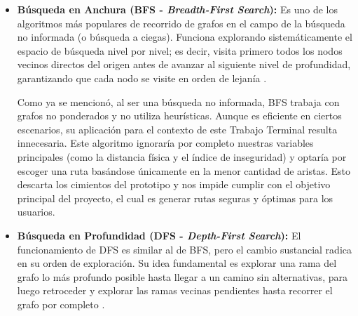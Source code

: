 \begin{itemize}

    
    \item \textbf{Búsqueda en Anchura (BFS - \textit{Breadth-First Search}):} Es uno de los algoritmos más populares de recorrido de grafos en el campo de la búsqueda no informada (o búsqueda a ciegas). Funciona explorando sistemáticamente el espacio de búsqueda nivel por nivel; es decir, visita primero todos los nodos vecinos directos del origen antes de avanzar al siguiente nivel de profundidad, garantizando que cada nodo se visite en orden de lejanía \cite{busqueda_info_no, bfs}.
    
    Como ya se mencionó, al ser una búsqueda no informada, BFS trabaja con grafos no ponderados y no utiliza heurísticas. Aunque es eficiente en ciertos escenarios, su aplicación para el contexto de este Trabajo Terminal resulta innecesaria. Este algoritmo ignoraría por completo nuestras variables principales (como la distancia física y el índice de inseguridad) y optaría por escoger una ruta basándose únicamente en la menor cantidad de aristas. Esto descarta los cimientos del prototipo y nos impide cumplir con el objetivo principal del proyecto, el cual es generar rutas seguras y óptimas para los usuarios.
    
    \item \textbf{Búsqueda en Profundidad (DFS - \textit{Depth-First Search}):} El funcionamiento de DFS es similar al de BFS, pero el cambio sustancial radica en su orden de exploración. Su idea fundamental es explorar una rama del grafo lo más profundo posible hasta llegar a un camino sin alternativas, para luego retroceder y explorar las ramas vecinas pendientes hasta recorrer el grafo por completo \cite{dfs}.
    

\end{itemize}
